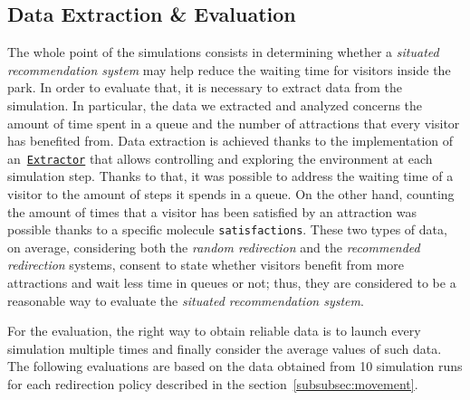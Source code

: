 \subsection{Data Extraction \& Evaluation}\label{subsec:data-extraction}
The whole point of the simulations consists in determining whether a \textit{situated recommendation system} may help reduce the waiting time for visitors inside the park.
In order to evaluate that, it is necessary to extract data from the simulation.
In particular, the data we extracted and analyzed concerns the amount of time spent in a queue and the number of attractions that every visitor has benefited from.
Data extraction is achieved thanks to the implementation of an~\href{https://alchemistsimulator.github.io/reference/kdoc/alchemist/it.unibo.alchemist.loader.export/-extractor/index.html}{\texttt{Extractor}} that allows controlling and exploring the environment at each simulation step.
Thanks to that, it was possible to address the waiting time of a visitor to the amount of steps it spends in a queue.
On the other hand, counting the amount of times that a visitor has been satisfied by an attraction was possible thanks to a specific molecule \texttt{satisfactions}.
These two types of data, on average, considering both the \textit{random redirection} and the \textit{recommended redirection} systems, consent to state whether visitors benefit from more attractions and wait less time in queues or not;
thus, they are considered to be a reasonable way to evaluate the \textit{situated recommendation system}.

For the evaluation, the right way to obtain reliable data is to launch every simulation multiple times and finally consider the average values of such data.
The following evaluations are based on the data obtained from 10 simulation runs for each redirection policy described in the section~\ref{subsubsec:movement}.

